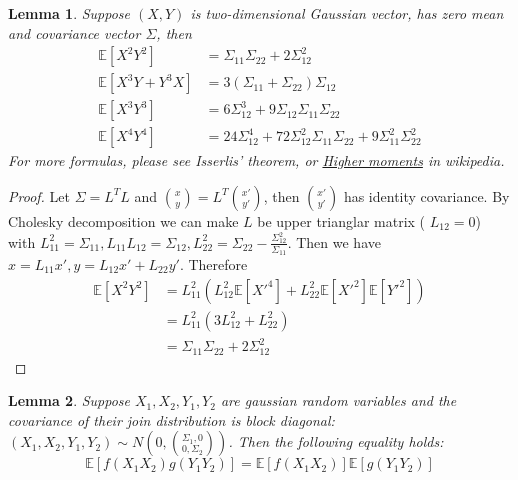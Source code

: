 \documentclass{article}
\def\E{\mathbb{E}}
\newtheorem{lemma}{Lemma}
\begin{document}
\begin{lemma}\label{lem:x2y2}
Suppose $(X,Y)$ is two-dimensional Gaussian vector, has zero mean and covariance vector $\Sigma$, then 
\begin{align*}
\E[X^2 Y^2] &= \Sigma_{11}\Sigma_{22} + 2\Sigma_{12}^2 \\
\E[X^3 Y + Y^3 X ] &= 3 (\Sigma_{11} + \Sigma_{22}) \Sigma_{12} \\
\E[X^3 Y^3] & = 6 \Sigma_{12}^3 + 9 \Sigma_{12} \Sigma_{11} \Sigma_{22}\\
\E[X^4 Y^4] & = 24 \Sigma_{12}^4 + 72 \Sigma_{12}^2 \Sigma_{11} \Sigma_{22} + 9\Sigma_{11}^2 \Sigma_{22}^2 
\end{align*}
For more formulas, please see Isserlis' theorem, or \href{https://en.wikipedia.org/wiki/Multivariate_normal_distribution#Higher_moments}{Higher moments} in wikipedia.
\end{lemma}
\begin{proof}
Let $\Sigma = L^T L $ and $\binom{x}{y} = L^T \binom{x'}{y'}$, then $\binom{x'}{y'}$ has identity covariance. By Cholesky decomposition we can make $L$ be upper trianglar matrix (
$L_{12}=0$) with $L_{11}^2 = \Sigma_{11}, L_{11}L_{12} = \Sigma_{12}, L_{22}^2 = \Sigma_{22} - \frac{\Sigma_{12}^2}{\Sigma_{11}}$. Then we have $x = L_{11} x', y = L_{12} x' + L_{22} y'$. Therefore
\begin{align*}
\E[X^2 Y^2] & = L_{11}^2 (L_{12}^2\E[X'^4]+ L^2_{22}\E[X'^2]\E[Y'^2]) \\
& = L_{11}^2(3L_{12}^2 + L^2_{22}) \\
& = \Sigma_{11}\Sigma_{22} + 2\Sigma_{12}^2
\end{align*}
\end{proof}
\begin{lemma}\label{lem:abcd}
Suppose $X_1, X_2, Y_1, Y_2$ are gaussian random variables and the covariance of their join distribution is block diagonal:
$(X_1, X_2, Y_1, Y_2) \sim N(0, \binom{\Sigma_1, 0}{0, \Sigma_2})$. Then the following equality holds:
\begin{equation}
\E[f(X_1X_2)g(Y_1Y_2)] = \E[f(X_1 X_2)] \E[g(Y_1 Y_2)]
\end{equation}
\end{lemma}
\end{document}
